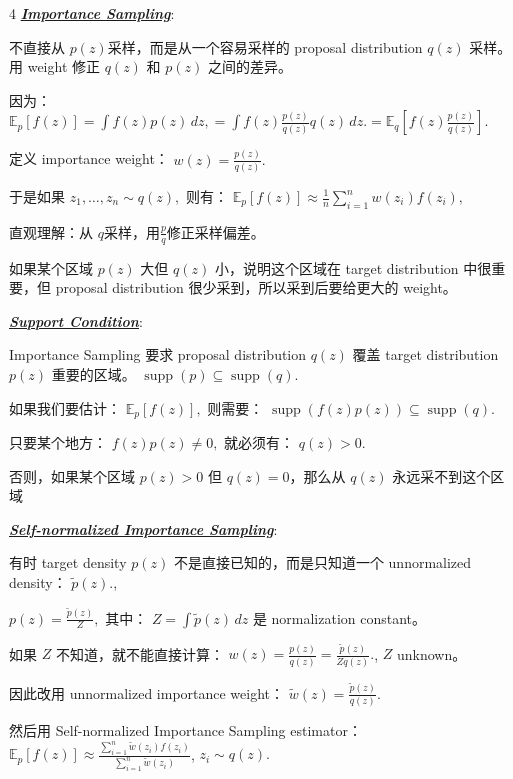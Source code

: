 \documentclass[12pt]{article}
\newcommand{\bulletPoint}[1]{\underline{\textit{\textbf{#1}}}}
\begin{document}
\begin{multicols*}{4}
\bulletPoint{Importance Sampling}:

不直接从 $p(z)$采样，而是从一个容易采样的 proposal distribution $q(z)$ 采样。用 weight 修正 $q(z)$ 和 $p(z)$ 之间的差异。

因为：
$
\mathbb E_p[f(z)]
=
\int f(z)p(z)\,dz,
=
\int f(z)\frac{p(z)}{q(z)}q(z)\,dz.
=
\mathbb E_q\left[
f(z)\frac{p(z)}{q(z)}
\right].
$

定义 importance weight：
$
w(z)=\frac{p(z)}{q(z)}.
$

于是如果
$
z_1,\dots,z_n\sim q(z),
$
则有：
$
\mathbb E_p[f(z)]
\approx
\frac{1}{n}
\sum_{i=1}^n
w(z_i)f(z_i),
$


直观理解：从 $q$采样，用$\frac{p}{q}$修正采样偏差。


如果某个区域 $p(z)$ 大但 $q(z)$ 小，说明这个区域在 target distribution 中很重要，但 proposal distribution 很少采到，所以采到后要给更大的 weight。


\bulletPoint{Support Condition}:

Importance Sampling 要求 proposal distribution $q(z)$ 覆盖 target distribution $p(z)$ 重要的区域。
$
\operatorname{supp}(p)
\subseteq
\operatorname{supp}(q).
$

如果我们要估计：
$
\mathbb E_p[f(z)],
$
则需要：
$
\operatorname{supp}(f(z)p(z))
\subseteq
\operatorname{supp}(q).
$

只要某个地方：
$
f(z)p(z)\neq 0,
$
就必须有：
$
q(z)>0.
$

否则，如果某个区域 $p(z)>0$ 但 $q(z)=0$，那么从 $q(z)$ 永远采不到这个区域


\bulletPoint{Self-normalized Importance Sampling}:

有时 target density $p(z)$ 不是直接已知的，而是只知道一个 unnormalized density：
$
\tilde p(z).
$,

$
p(z)=\frac{\tilde p(z)}{Z},
$
其中：
$
Z=\int \tilde p(z)\,dz
$
是 normalization constant。

如果 $Z$ 不知道，就不能直接计算：
$
w(z)
=
\frac{p(z)}{q(z)}
=
\frac{\tilde p(z)}{Zq(z)}.
$, $Z$ unknown。

因此改用 unnormalized importance weight：
$
\tilde w(z)=\frac{\tilde p(z)}{q(z)}.
$

然后用 Self-normalized Importance Sampling estimator：
$
\mathbb E_p[f(z)]
\approx
\frac{
\sum_{i=1}^n \tilde w(z_i)f(z_i)
}{
\sum_{i=1}^n \tilde w(z_i)
}$, 
$
z_i\sim q(z).
$




\end{multicols*}
\end{document}
